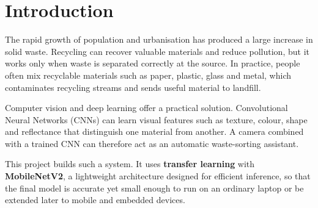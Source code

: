 \section{Introduction}
The rapid growth of population and urbanisation has produced a large increase in solid waste. Recycling can recover valuable materials and reduce pollution, but it works only when waste is separated correctly at the source. In practice, people often mix recyclable materials such as paper, plastic, glass and metal, which contaminates recycling streams and sends useful material to landfill.

Computer vision and deep learning offer a practical solution. Convolutional Neural Networks (CNNs) can learn visual features such as texture, colour, shape and reflectance that distinguish one material from another. A camera combined with a trained CNN can therefore act as an automatic waste-sorting assistant.

This project builds such a system. It uses \textbf{transfer learning} with \textbf{MobileNetV2}, a lightweight architecture designed for efficient inference, so that the final model is accurate yet small enough to run on an ordinary laptop or be extended later to mobile and embedded devices.
